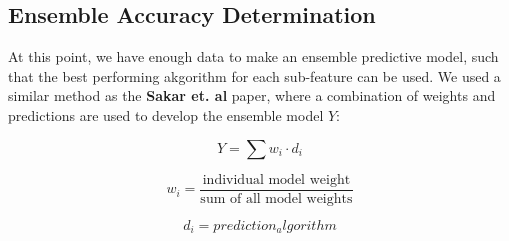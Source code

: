 \documentclass[
]{article}
\begin{document}
\newpage

\hypertarget{ensemble-accuracy-determination}{%
\subsection{Ensemble Accuracy Determination}\label{ensemble-accuracy-determination}}

At this point, we have enough data to make an ensemble predictive model, such that the best performing akgorithm for each sub-feature can be used. We used a similar method as the \textbf{Sakar et. al} paper, where a combination of weights and predictions are used to develop the ensemble model \(Y\):

\begin{equation}
Y = \sum w_i \cdot d_i
\label{eq:weighted_sum}
\end{equation}

\begin{equation}
w_i = \frac{\text{individual model weight}}{\text{sum of all model weights}}
\end{equation}

\begin{equation}
d_i = prediction_algorithm
\end{equation}
\end{document}
